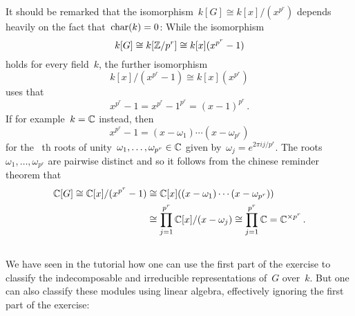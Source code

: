 \section{}





\subsection{}

It should be remarked that the isomorphism~$k[G] \cong k[x]/(x^{p^r})$ depends heavily on the fact that~$\operatorname{char}(k) = 0$:
While the isomorphism
\[
        k[G]
  \cong k[\mathbb{Z}/p^r]
  \cong k[x](x^{p^r} - 1)
\]
holds for every field~$k$, the further isomorphism
\[
        k[x]/(x^{p^r} - 1)
  \cong k[x](x^{p^r})
\]
uses that
\[
    x^{p^r} - 1
  = x^{p^r} - 1^{p^r}
  = (x - 1)^{p^r} \,.
\]
If for example~$k = \mathbb{C}$ instead, then
\[
    x^{p^r} - 1
  = (x - \omega_1) \dotsm (x - \omega_{p^r})
\]
for the~ {th} roots of unity~$\omega_1, \dotsc, \omega_{p^r} \in \mathbb{C}$ given by~$\omega_j = e^{2 \pi i j / p^r}$.
The roots~$\omega_1, \dotsc, \omega_{p^r}$ are pairwise distinct and so it follows from the chinese reminder theorem that
\begin{align*}
          \mathbb{C}[G]
   \cong  \mathbb{C}[x]/(x^{p^r} - 1)
  &\cong  \mathbb{C}[x]( (x - \omega_1) \dotsm (x - \omega_{p^r}) ) \\
  &\cong  \prod_{j=1}^{p^r} \mathbb{C}[x]/(x - \omega_j)
   \cong  \prod_{j=1}^{p^r} \mathbb{C}
   =      \mathbb{C}^{\times p^r} \,.
\end{align*}







\subsection{}

We have seen in the tutorial how one can use the first part of the exercise to classify the {\fd} indecomposable and irreducible representations of~$G$ over~$k$.
But one can also classify these modules using linear algebra, effectively ignoring the first part of the exercise:

